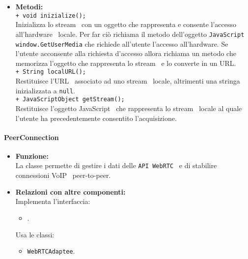 {{\begin{sloppypar}
{{{\begin{itemize}
{					\texttt{- String localURL}: la stringa contiene l'URL\g~ associato allo stream\g~ locale al quale l'utente ha garantito l'accesso, se la stringa è uguale a null allora o l'utente ha rifiutato la richiesta dell'applicazione di accedere all'hardware\g~ oppure non ha ancora dato il consenso.\\
				}
			
				\item[] \textbf{Metodi:}{\\
					\texttt{+ void inizialize();}\\ 
					Inizializza lo stream\g~ con un oggetto che rappresenta e consente l'accesso all'hardware\g~ locale. Per far ciò richiama il metodo dell'oggetto \texttt{JavaScript window.GetUserMedia} che richiede all'utente l'accesso all'hardware\g. Se l'utente acconsente alla richiesta d'accesso allora richiama un metodo che memorizza l'oggetto che rappresenta lo stream\g~ e lo converte in un URL\g.\\

					\texttt{+ String localURL();}\\
					Restituisce l'URL\g~ associato ad uno stream\g~ locale, altrimenti una stringa inizializzata a \texttt{null}.\\

					\texttt{+ JavaScriptObject getStream();}\\
					Restituisce l'oggetto JavaScript\g~ che rappresenta lo stream\g~ locale al quale l'utente ha precedentemente consentito l'acquisizione.\\
				}
			\end{itemize}
			}


		

			\paragraph{PeerConnection}\label{par:PeerConnection}{
			\begin{itemize}
				\item[] \textbf{Funzione:}\\
					La classe permette di gestire i dati delle \texttt{API WebRTC}\g~ e di stabilire connessioni VoIP\g~ peer-to-peer\g.
			
				\item[] \textbf{Relazioni con altre componenti:}\\
					Implementa l'interfaccia: 
					\begin{itemize}
						\item[] .
					\end{itemize}
					Usa le classi:
					\begin{itemize}
						\item[] \texttt{WebRTCAdaptee}.\\
					\end{itemize}
				

\end{itemize}}}}
\end{sloppypar}}}
